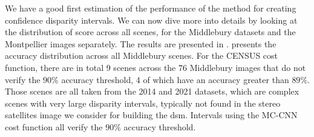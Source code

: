 We have a good first estimation of the performance of the method for creating confidence disparity intervals. We can now dive more into details by looking at the distribution of score across all scenes, for the Middlebury datasets and the Montpellier images separately. The results are presented in .  presents the accuracy distribution across all Middlebury scenes. For the CENSUS cost function, there are in total 9 scenes across the 76 Middlebury images that do not verify the $90\%$ accuracy threshold, 4 of which have an accuracy greater than $89\%$. Those scenes are all taken from the 2014 and 2021 datasets, which are complex scenes with very large disparity intervals, typically not found in the stereo satellites image we consider for building the \acrshort{dsm}. Intervals using the MC-CNN cost function all verify the $90\%$ accuracy threshold.


